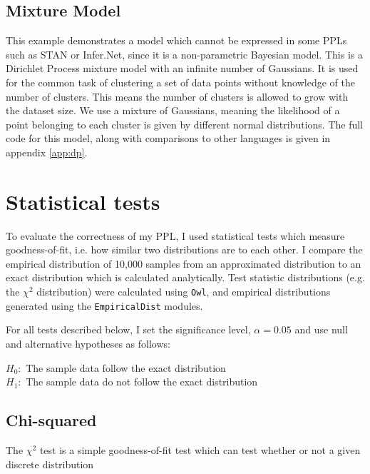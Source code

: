 \subsection{Mixture Model}
This example demonstrates a model which cannot be expressed in some PPLs such as STAN or Infer.Net, since it is a non-parametric Bayesian model. This is a Dirichlet Process mixture model with an infinite number of Gaussians\cite{dpmm}. It is used for the common task of clustering a set of data points without knowledge of the number of clusters. This means the number of clusters is allowed to grow with the dataset size. We use a mixture of Gaussians, meaning the likelihood of a point belonging to each cluster is given by different normal distributions. The full code for this model, along with comparisons to other languages is given in appendix \ref{app:dp}.


\section{Statistical tests}
To evaluate the correctness of my PPL, I used statistical tests which measure goodness-of-fit, i.e. how similar two distributions are to each other. I compare the empirical distribution of 10,000 samples from an approximated distribution to an exact distribution which is calculated analytically. Test statistic distributions (e.g. the $\chi^2$ distribution) were calculated using \texttt{Owl}, and empirical distributions generated using the \texttt{EmpiricalDist} modules.

For all tests described below, I set the significance level, $\alpha = 0.05$ and use null and alternative hypotheses as follows:

$H_0:$ The sample data follow the exact distribution\\
$H_1:$ The sample data do not follow the exact distribution

\subsection{Chi-squared}

The $\chi^2$ test is a simple goodness-of-fit test which can test whether or not a given discrete distribution 

